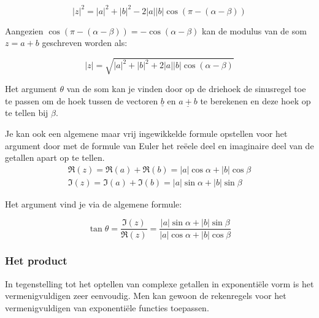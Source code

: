 \[ |z|^2 =|a|^2 +|b|^2 -2|a||b|\cos(\pi-(\alpha-\beta))  \]

Aangezien $\cos(\pi-(\alpha-\beta))=-\cos(\alpha-\beta)$ kan de modulus van de som $z=a+b$ geschreven worden als:\\

\begin{eigenschap}
	\begin{framed}
	\[ |z|=\sqrt{|a|^2 +|b|^2 +2|a||b|\cos(\alpha-\beta)} \]
\end{framed}
\end{eigenschap}

Het argument $\theta$ van de som  kan je vinden door op de driehoek de sinusregel toe te passen om de hoek tussen de vectoren $\underline{b}$ en $\underline{a+b}$ te berekenen en deze hoek op te tellen bij $\beta$.\\

\vspace{0.2cm}

Je kan ook een algemene maar vrij ingewikkelde formule opstellen voor het argument door met de formule van Euler het re\"{e}ele deel en imaginaire deel van de getallen apart op te tellen.\\

\[  \begin{array}{l}  
\Re(z)=\Re(a)+\Re(b)=|a|\cos \alpha + |b|\cos \beta \\
\Im(z)=\Im(a)+\Im(b)=|a|\sin \alpha + |b|\sin \beta  \end{array} \] 

Het argument vind je via de algemene formule:\\

\begin{eigenschap}
	\begin{framed}
	\[ \tan \theta =\frac{\Im(z)}{\Re(z)}=\frac{|a|\sin \alpha + |b|\sin \beta}{|a|\cos \alpha + |b|\cos \beta}   \]
\end{framed}
\end{eigenschap}

\subsubsection{Het product}

In tegenstelling tot het optellen van complexe getallen in exponenti\"{e}le vorm is het vermenigvuldigen zeer eenvoudig. Men kan gewoon de rekenregels voor het vermenigvuldigen van exponenti\"{e}le functies toepassen.\\

